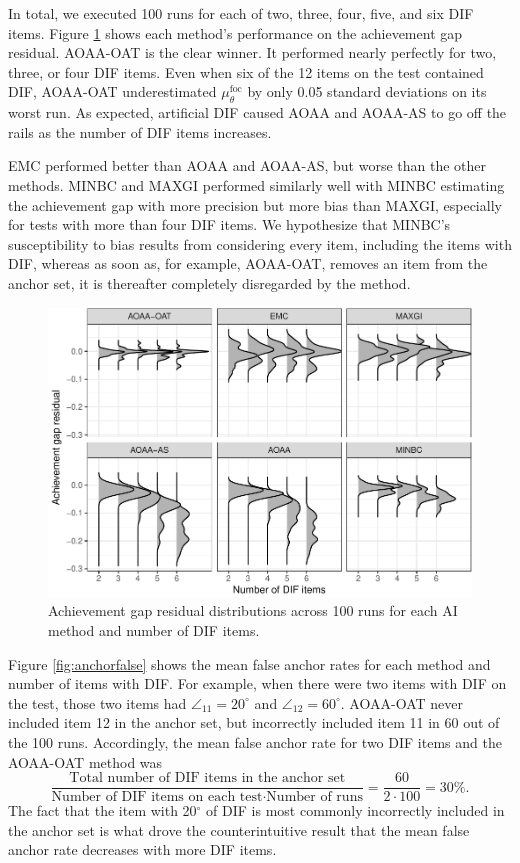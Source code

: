 \documentclass[
  11pt,
]{article}
\begin{document}
In total, we executed 100 runs for each of two, three, four, five, and six DIF items. Figure \ref{fig:achievegap} shows each method's performance on the achievement gap residual. AOAA-OAT is the clear winner. It performed nearly perfectly for two, three, or four DIF items. Even when six of the 12 items on the test contained DIF, AOAA-OAT underestimated \(\mu_\theta^\text{foc}\) by only 0.05 standard deviations on its worst run. As expected, artificial DIF caused AOAA and AOAA-AS to go off the rails as the number of DIF items increases.

EMC performed better than AOAA and AOAA-AS, but worse than the other methods. MINBC and MAXGI performed similarly well with MINBC estimating the achievement gap with more precision but more bias than MAXGI, especially for tests with more than four DIF items. We hypothesize that MINBC's susceptibility to bias results from considering every item, including the items with DIF, whereas as soon as, for example, AOAA-OAT, removes an item from the anchor set, it is thereafter completely disregarded by the method.

\begin{figure}[H]

{\centering \includegraphics[width=0.7\linewidth]{paper_files/figure-latex/achievegap-1} 

}

\caption{Achievement gap residual distributions across 100 runs for each AI method and number of DIF items.}\label{fig:achievegap}
\end{figure}

Figure \ref{fig:anchorfalse} shows the mean false anchor rates for each method and number of items with DIF. For example, when there were two items with DIF on the test, those two items had \(\angle_{11} = 20^\circ\) and \(\angle_{12} = 60^\circ\). AOAA-OAT never included item 12 in the anchor set, but incorrectly included item 11 in 60 out of the 100 runs. Accordingly, the mean false anchor rate for two DIF items and the AOAA-OAT method was
\[
\dfrac{\text{Total number of DIF items in the anchor set}}{\text{Number of DIF items on each test} \cdot \text{Number of runs}} = \dfrac{60}{2 \cdot 100} = 30\%.
\]
The fact that the item with 20\(^\circ\) of DIF is most commonly incorrectly included in the anchor set is what drove the counterintuitive result that the mean false anchor rate decreases with more DIF items.
\end{document}
